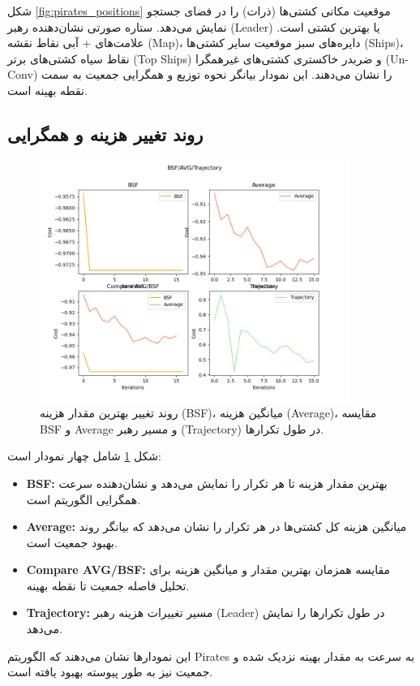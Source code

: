 شکل \ref{fig:pirates_positions} موقعیت مکانی کشتی‌ها (ذرات) را در فضای جستجو نمایش می‌دهد. ستاره صورتی نشان‌دهنده رهبر (Leader) یا بهترین کشتی است. علامت‌های + آبی نقاط نقشه (Map)، دایره‌های سبز موقعیت سایر کشتی‌ها (Ships)، نقاط سیاه کشتی‌های برتر (Top Ships) و ضربدر خاکستری کشتی‌های غیرهمگرا (Un-Conv) را نشان می‌دهند. این نمودار بیانگر نحوه توزیع و همگرایی جمعیت به سمت نقطه بهینه است.

\subsection{روند تغییر هزینه و همگرایی}
\begin{figure}[h!]
    \centering
    \includegraphics[width=0.9\textwidth]{images/pirates_bsf_avg_trajectory.png}
    \caption{روند تغییر بهترین مقدار هزینه (BSF)، میانگین هزینه (Average)، مقایسه BSF و Average و مسیر رهبر (Trajectory) در طول تکرارها.}
    \label{fig:pirates_bsf_avg_trajectory}
\end{figure}

شکل \ref{fig:pirates_bsf_avg_trajectory} شامل چهار نمودار است:
\begin{itemize}
    \item \textbf{BSF:} بهترین مقدار هزینه تا هر تکرار را نمایش می‌دهد و نشان‌دهنده سرعت همگرایی الگوریتم است.
    \item \textbf{Average:} میانگین هزینه کل کشتی‌ها در هر تکرار را نشان می‌دهد که بیانگر روند بهبود جمعیت است.
    \item \textbf{Compare AVG/BSF:} مقایسه همزمان بهترین مقدار و میانگین هزینه برای تحلیل فاصله جمعیت تا نقطه بهینه.
    \item \textbf{Trajectory:} مسیر تغییرات هزینه رهبر (Leader) در طول تکرارها را نمایش می‌دهد.
\end{itemize}
این نمودارها نشان می‌دهند که الگوریتم Pirates به سرعت به مقدار بهینه نزدیک شده و جمعیت نیز به طور پیوسته بهبود یافته است.

